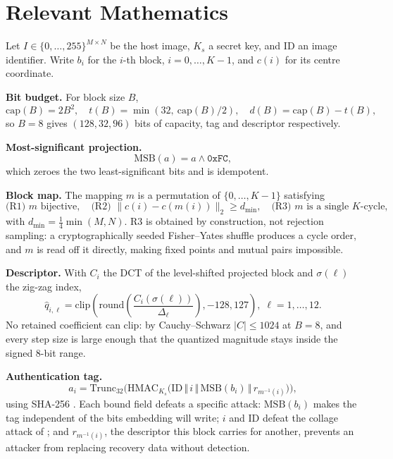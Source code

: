 \documentclass[12pt,a4paper]{article}
\begin{document}
\section{Relevant Mathematics}

Let $I \in \{0,\dots,255\}^{M \times N}$ be the host image, $K_s$ a secret key,
and $\mathrm{ID}$ an image identifier. Write $b_i$ for the $i$-th block,
$i = 0,\dots,K-1$, and $c(i)$ for its centre coordinate.

\textbf{Bit budget.} For block size $B$,
\begin{equation}
\mathrm{cap}(B) = 2B^2, \quad
t(B) = \min(32,\ \mathrm{cap}(B)/2), \quad
d(B) = \mathrm{cap}(B) - t(B),
\end{equation}
so $B=8$ gives $(128, 32, 96)$ bits of capacity, tag and descriptor respectively.

\textbf{Most-significant projection.}
\begin{equation}
\mathrm{MSB}(a) = a \wedge \mathtt{0xFC},
\end{equation}
which zeroes the two least-significant bits and is idempotent.

\textbf{Block map.} The mapping $m$ is a permutation of $\{0,\dots,K-1\}$
satisfying
\begin{equation}
\text{(R1) } m \text{ bijective}, \quad
\text{(R2) } \lVert c(i) - c(m(i)) \rVert_2 \ge d_{\min}, \quad
\text{(R3) } m \text{ is a single } K\text{-cycle},
\end{equation}
with $d_{\min} = \tfrac{1}{4}\min(M,N)$. R3 is obtained by construction, not
rejection sampling: a cryptographically seeded Fisher--Yates shuffle produces
a cycle order, and $m$ is read off it directly, making fixed points and
mutual pairs impossible.

\textbf{Descriptor.} With $C_i$ the DCT of the level-shifted projected block and
$\sigma(\ell)$ the zig-zag index,
\begin{equation}
\hat{q}_{i,\ell} = \mathrm{clip}\!\left(\mathrm{round}\!\left(
\frac{C_i(\sigma(\ell))}{\Delta_\ell}\right), -128, 127\right),\;
\ell = 1,\dots,12 .
\end{equation}
No retained coefficient can clip: by Cauchy--Schwarz $|C| \le 1024$ at $B=8$, and
every step size is large enough that the quantized magnitude stays inside the
signed 8-bit range.

\textbf{Authentication tag.}
\begin{equation}
a_i = \mathrm{Trunc}_{32}\Big(\mathrm{HMAC}_{K_s}\big(
\mathrm{ID} \,\Vert\, i \,\Vert\, \mathrm{MSB}(b_i) \,\Vert\, r_{m^{-1}(i)}\big)\Big),
\end{equation}
using SHA-256 \cite{fips180-4}. Each bound field defeats a specific attack:
$\mathrm{MSB}(b_i)$ makes the tag independent of the bits embedding will write;
$i$ and $\mathrm{ID}$ defeat the collage attack of
\cite{holliman2000counterfeiting}; and $r_{m^{-1}(i)}$, the descriptor this block
carries for another, prevents an attacker from replacing recovery data without
detection.
\end{document}
